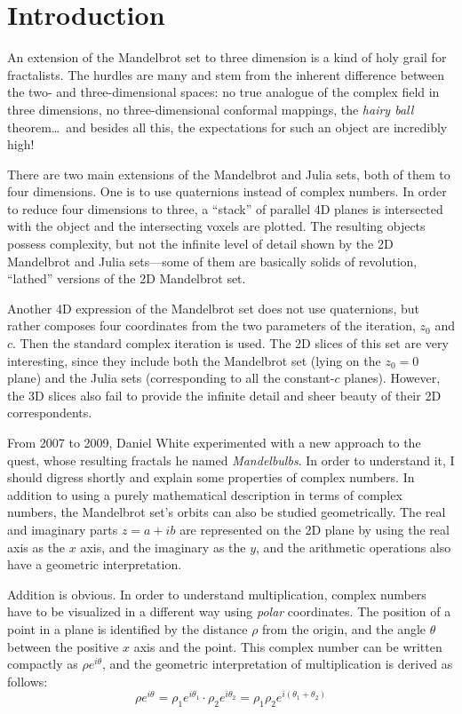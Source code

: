 \documentclass{article}
\begin{document}
\clearpage

\section{Introduction}

An extension of the Mandelbrot set to three dimension is a kind of holy
grail for fractalists.  The hurdles are many and stem from the inherent
difference between the two- and three-dimensional spaces: no true analogue
of the complex field in three dimensions, no three-dimensional conformal
mappings, the \emph{hairy ball} theorem\dots\ and besides all this,
the expectations for such an object are incredibly high!

There are two main extensions of the Mandelbrot and Julia sets, both
of them to four dimensions.  One is to use quaternions instead of
complex numbers.  In order to reduce four dimensions to three, a
``stack'' of parallel 4D planes is intersected with the object and the
intersecting voxels are plotted.  The resulting objects possess
complexity, but not the infinite level of detail shown by the 2D
Mandelbrot and Julia sets---some of them are basically solids of
revolution, ``lathed'' versions of the 2D Mandelbrot set.

Another 4D expression of the Mandelbrot set does not use quaternions,
but rather composes four coordinates from the two parameters of
the iteration, $z_0$ and $c$.  Then the standard complex iteration
is used.  The 2D slices of this set are very interesting, since
they include both the Mandelbrot set (lying on the $z_0=0$ plane)
and the Julia sets (corresponding to all the constant-$c$ planes).
However, the 3D slices also fail to provide the infinite detail
and sheer beauty of their 2D correspondents.

From 2007 to 2009, Daniel White experimented with a new approach to
the quest, whose resulting fractals he named \emph{Mandelbulbs}.  In
order to understand it, I should digress shortly and explain some
properties of complex numbers.  In addition to using a purely
mathematical description in terms of complex numbers, the Mandelbrot
set's orbits can also be studied geometrically.  The real and
imaginary parts $z=a+ib$ are represented on the 2D plane by using the
real axis as the $x$ axis, and the imaginary as the $y$, and the
arithmetic operations also have a geometric interpretation.

Addition is obvious.  In order to understand multiplication, complex
numbers have to be visualized in a different way using \emph{polar}
coordinates.  The position of a point in a plane is identified by the
distance $\rho$ from the origin, and the angle $\theta$ between the
positive $x$ axis and the point.  This complex number can be written
compactly as $\rho e^{i \theta}$, and the geometric interpretation
of multiplication is derived as follows:
\begin{equation*}
  \rho e^{i \theta} =  \rho_1 e^{i \theta_1} \cdot \rho_2 e^{i \theta_2}
    = \rho_1\rho_2 e^{i (\theta_1 + \theta_2)}
\end{equation*}
  
\end{document}
